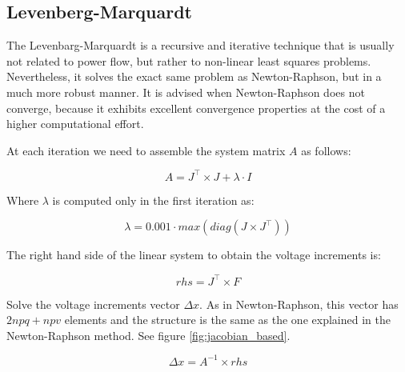 \documentclass[a4paper,twoside,fleqn]{tufte-book}
\begin{document}
\newpage
\subsection{Levenberg-Marquardt} \label{LM-Method}

The Levenbarg-Marquardt is a recursive and iterative technique that is usually not related to power flow, but rather to non-linear least squares problems. Nevertheless, it solves the exact same problem as Newton-Raphson, but in a much more robust manner. It is advised when Newton-Raphson does not converge, because it exhibits excellent convergence properties at the cost of a higher computational effort.


At each iteration we need to assemble the system matrix $A$ as follows:
%
%
%


\begin{equation}
A = J^\top \times J + \lambda \cdot I
\label{eq:lm_A}
\end{equation}

Where $\lambda$ is computed only in the first iteration as:

\begin{equation}
\lambda = 0.001 \cdot max(diag(J \times J^\top))
\end{equation}

The right hand side of the linear system to obtain the voltage increments is:


\begin{equation}
rhs = J^\top \times F
\label{eq:lm_rhs}
\end{equation}


Solve the voltage increments vector $\Delta x$. As in Newton-Raphson, this vector has $2npq+npv$ elements and the structure is the same as the one explained in the Newton-Raphson method. See figure \ref{fig:jacobian_based}.


\begin{equation}
\Delta x = A^{-1} \times rhs
\label{eq:lm_solve}
\end{equation}
\end{document}

